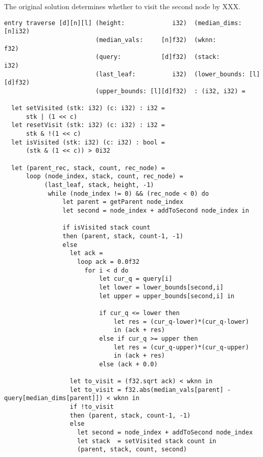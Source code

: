 The original solution determines whether to visit the second node by XXX. 










\begin{listing}[H]
\begin{verbatim}
entry traverse [d][n][l] (height:             i32)  (median_dims:     [n]i32)
                         (median_vals:     [n]f32)  (wknn:               f32)
                         (query:           [d]f32)  (stack:              i32) 
                         (last_leaf:          i32)  (lower_bounds: [l][d]f32)
                         (upper_bounds: [l][d]f32)  : (i32, i32) =

  let setVisited (stk: i32) (c: i32) : i32 =
      stk | (1 << c)
  let resetVisit (stk: i32) (c: i32) : i32 =
      stk & !(1 << c)
  let isVisited (stk: i32) (c: i32) : bool =
      (stk & (1 << c)) > 0i32

  let (parent_rec, stack, count, rec_node) =
      loop (node_index, stack, count, rec_node) =
           (last_leaf, stack, height, -1)
            while (node_index != 0) && (rec_node < 0) do
                let parent = getParent node_index
                let second = node_index + addToSecond node_index in

                if isVisited stack count
                then (parent, stack, count-1, -1)
                else
                  let ack = 
                    loop ack = 0.0f32
                      for i < d do
                          let cur_q = query[i]
                          let lower = lower_bounds[second,i]
                          let upper = upper_bounds[second,i] in

                          if cur_q <= lower then
                              let res = (cur_q-lower)*(cur_q-lower)
                              in (ack + res)
                          else if cur_q >= upper then
                              let res = (cur_q-upper)*(cur_q-upper)
                              in (ack + res)
                          else (ack + 0.0)

                  let to_visit = (f32.sqrt ack) < wknn in
                  let to_visit = f32.abs(median_vals[parent] - query[median_dims[parent]]) < wknn in
                  if !to_visit
                  then (parent, stack, count-1, -1)
                  else
                    let second = node_index + addToSecond node_index
                    let stack  = setVisited stack count in
                    (parent, stack, count, second)



\end{verbatim}
\end{listing}
